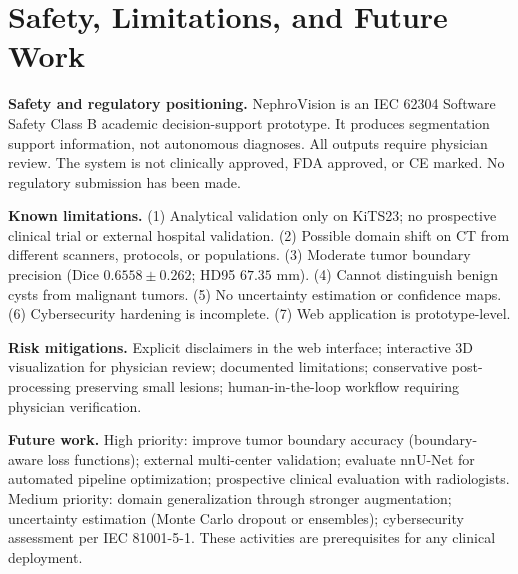 ﻿\section{Safety, Limitations, and Future Work}

\textbf{Safety and regulatory positioning.} NephroVision is an IEC 62304 Software Safety Class B academic decision-support prototype. It produces segmentation support information, not autonomous diagnoses. All outputs require physician review. The system is not clinically approved, FDA approved, or CE marked. No regulatory submission has been made.

\textbf{Known limitations.} (1) Analytical validation only on KiTS23; no prospective clinical trial or external hospital validation. (2) Possible domain shift on CT from different scanners, protocols, or populations. (3) Moderate tumor boundary precision (Dice $0.6558 \pm 0.262$; HD95 $67.35$ mm). (4) Cannot distinguish benign cysts from malignant tumors. (5) No uncertainty estimation or confidence maps. (6) Cybersecurity hardening is incomplete. (7) Web application is prototype-level.

\textbf{Risk mitigations.} Explicit disclaimers in the web interface; interactive 3D visualization for physician review; documented limitations; conservative post-processing preserving small lesions; human-in-the-loop workflow requiring physician verification.

\textbf{Future work.} High priority: improve tumor boundary accuracy (boundary-aware loss functions); external multi-center validation; evaluate nnU-Net for automated pipeline optimization; prospective clinical evaluation with radiologists. Medium priority: domain generalization through stronger augmentation; uncertainty estimation (Monte Carlo dropout or ensembles); cybersecurity assessment per IEC 81001-5-1. These activities are prerequisites for any clinical deployment.

